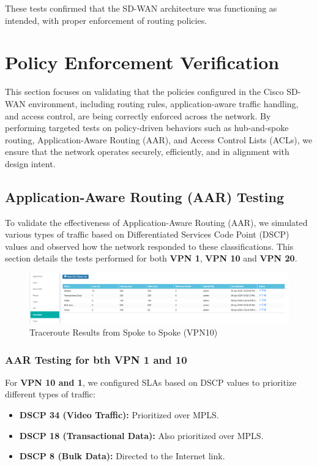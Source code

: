 \documentclass[12pt,english]{report}
\begin{document}
These tests confirmed that the SD-WAN architecture was functioning as intended, with proper enforcement of routing policies.

\section{Policy Enforcement Verification}
This section focuses on validating that the policies configured in the Cisco SD-WAN environment, including routing rules, application-aware traffic handling, and access control, are being correctly enforced across the network. By performing targeted tests on policy-driven behaviors such as hub-and-spoke routing, Application-Aware Routing (AAR), and Access Control Lists (ACLs), we ensure that the network operates securely, efficiently, and in alignment with design intent.

\subsection{Application-Aware Routing (AAR) Testing}

To validate the effectiveness of Application-Aware Routing (AAR), we simulated various types of traffic based on Differentiated Services Code Point (DSCP) values and observed how the network responded to these classifications. This section details the tests performed for both \textbf{VPN 1}, \textbf{VPN 10} and \textbf{VPN 20}.

\begin{figure}[H]
    \centering
    \includegraphics[width=1\textwidth]{chapter 4/SLA.png}
    \caption{Traceroute Results from Spoke to Spoke (VPN10)}
    \label{fig:traceroute_spoke_to_spoke}
\end{figure}

\subsubsection{AAR Testing for bth VPN 1 and 10 }

For \textbf{VPN 10 and 1}, we configured SLAs based on DSCP values to prioritize different types of traffic:

\begin{itemize}
    \item \textbf{DSCP 34 (Video Traffic):} Prioritized over MPLS.
    \item \textbf{DSCP 18 (Transactional Data):} Also prioritized over MPLS.
    \item \textbf{DSCP 8 (Bulk Data):} Directed to the Internet link.
\end{itemize}
\end{document}
